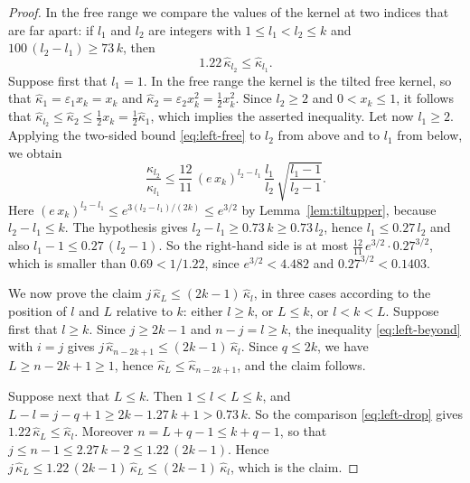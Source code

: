 \documentclass{amsart}
\theoremstyle{definition}
\theoremstyle{remark}
\numberwithin{equation}{section}
\begin{document}
\begin{proof}
In the free range we compare the values of the kernel at two indices that are far apart: if $l_1$ and $l_2$ are integers with $1\le l_1<l_2\le k$ and $100\,(l_2-l_1)\ge 73\,k$, then
\begin{equation}\label{eq:left-drop}
1.22\,\hat\kappa_{l_2}\le\hat\kappa_{l_1}.
\end{equation}
Suppose first that $l_1=1$. In the free range the kernel is the tilted free kernel, so that $\hat\kappa_1=\varepsilon_1x_k=x_k$ and $\hat\kappa_2=\varepsilon_2x_k^2=\frac12x_k^2$. Since $l_2\ge 2$ and $0<x_k\le 1$, it follows that $\hat\kappa_{l_2}\le\hat\kappa_2\le\frac12x_k=\frac12\hat\kappa_1$, which implies the asserted inequality. Let now $l_1\ge 2$. Applying the two-sided bound \eqref{eq:left-free} to $l_2$ from above and to $l_1$ from below, we obtain
\[
\frac{\hat\kappa_{l_2}}{\hat\kappa_{l_1}}\le\frac{12}{11}\,(e\,x_k)^{l_2-l_1}\,\frac{l_1}{l_2}\,\sqrt{\frac{l_1-1}{l_2-1}}.
\]
Here $(e\,x_k)^{l_2-l_1}\le e^{3(l_2-l_1)/(2k)}\le e^{3/2}$ by Lemma~\ref{lem:tiltupper}, because $l_2-l_1\le k$. The hypothesis gives $l_2-l_1\ge 0.73\,k\ge 0.73\,l_2$, hence $l_1\le 0.27\,l_2$ and also $l_1-1\le 0.27\,(l_2-1)$. So the right-hand side is at most $\frac{12}{11}\,e^{3/2}\cdot 0.27^{3/2}$, which is smaller than $0.69<1/1.22$, since $e^{3/2}<4.482$ and $0.27^{3/2}<0.1403$.

We now prove the claim $j\,\hat\kappa_L\le(2k-1)\,\hat\kappa_l$, in three cases according to the position of $l$ and $L$ relative to $k$: either $l\ge k$, or $L\le k$, or $l<k<L$. Suppose first that $l\ge k$. Since $j\ge 2k-1$ and $n-j=l\ge k$, the inequality \eqref{eq:left-beyond} with $i=j$ gives $j\,\hat\kappa_{n-2k+1}\le(2k-1)\,\hat\kappa_l$. Since $q\le 2k$, we have $L\ge n-2k+1\ge 1$, hence $\hat\kappa_L\le\hat\kappa_{n-2k+1}$, and the claim follows.

Suppose next that $L\le k$. Then $1\le l<L\le k$, and $L-l=j-q+1\ge 2k-1.27\,k+1>0.73\,k$. So the comparison \eqref{eq:left-drop} gives $1.22\,\hat\kappa_L\le\hat\kappa_l$. Moreover $n=L+q-1\le k+q-1$, so that $j\le n-1\le 2.27\,k-2\le 1.22\,(2k-1)$. Hence $j\,\hat\kappa_L\le 1.22\,(2k-1)\,\hat\kappa_L\le(2k-1)\,\hat\kappa_l$, which is the claim.


\end{proof}
\end{document}
